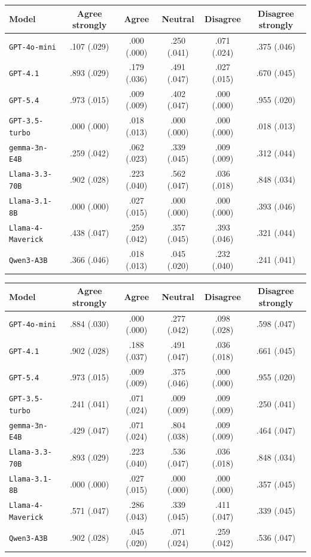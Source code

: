 \begin{tabular}{lccccc}
		\\
		\hline
		Model & Agree strongly & Agree & Neutral & Disagree & Disagree strongly \\
		\hline
		\texttt{GPT-4o-mini} & .107 (.029) & .000 (.000) & .250 (.041) & .071 (.024) & .375 (.046) \\
		\texttt{GPT-4.1} & .893 (.029) & .179 (.036) & .491 (.047) & .027 (.015) & .670 (.045) \\
		\texttt{GPT-5.4} & .973 (.015) & .009 (.009) & .402 (.047) & .000 (.000) & .955 (.020) \\
		\texttt{GPT-3.5-turbo} & .000 (.000) & .018 (.013) & .000 (.000) & .000 (.000) & .018 (.013) \\
		\texttt{gemma-3n-E4B} & .259 (.042) & .062 (.023) & .339 (.045) & .009 (.009) & .312 (.044) \\
		\texttt{Llama-3.3-70B} & .902 (.028) & .223 (.040) & .562 (.047) & .036 (.018) & .848 (.034) \\
		\texttt{Llama-3.1-8B} & .000 (.000) & .027 (.015) & .000 (.000) & .000 (.000) & .393 (.046) \\
		\texttt{Llama-4-Maverick} & .438 (.047) & .259 (.042) & .357 (.045) & .393 (.046) & .321 (.044) \\
		\texttt{Qwen3-A3B} & .366 (.046) & .018 (.013) & .045 (.020) & .232 (.040) & .241 (.041) \\
		\hline
\end{tabular}


\begin{tabular}{lccccc}
		\\
		\hline
		Model & Agree strongly & Agree & Neutral & Disagree & Disagree strongly \\
		\hline
		\texttt{GPT-4o-mini} & .884 (.030) & .000 (.000) & .277 (.042) & .098 (.028) & .598 (.047) \\
		\texttt{GPT-4.1} & .902 (.028) & .188 (.037) & .491 (.047) & .036 (.018) & .661 (.045) \\
		\texttt{GPT-5.4} & .973 (.015) & .009 (.009) & .375 (.046) & .000 (.000) & .955 (.020) \\
		\texttt{GPT-3.5-turbo} & .241 (.041) & .071 (.024) & .009 (.009) & .009 (.009) & .250 (.041) \\
		\texttt{gemma-3n-E4B} & .429 (.047) & .071 (.024) & .804 (.038) & .009 (.009) & .464 (.047) \\
		\texttt{Llama-3.3-70B} & .893 (.029) & .223 (.040) & .536 (.047) & .036 (.018) & .848 (.034) \\
		\texttt{Llama-3.1-8B} & .000 (.000) & .027 (.015) & .000 (.000) & .000 (.000) & .357 (.045) \\
		\texttt{Llama-4-Maverick} & .571 (.047) & .286 (.043) & .339 (.045) & .411 (.047) & .339 (.045) \\
		\texttt{Qwen3-A3B} & .902 (.028) & .045 (.020) & .071 (.024) & .259 (.042) & .536 (.047) \\
		\hline
\end{tabular}

